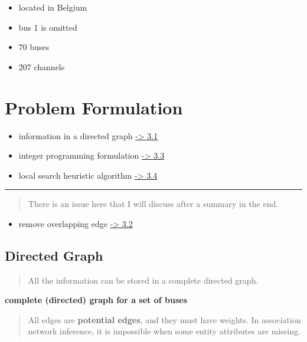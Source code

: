 \documentclass[
]{book}
\providecommand{\tightlist}{%
  \setlength{\itemsep}{0pt}\setlength{\parskip}{0pt}}
\begin{document}
\begin{itemize}
\tightlist
\item
  located in Belgium
\item
  bus 1 is omitted
\item
  70 buses
\item
  207 channels
\end{itemize}

\hypertarget{problem-formulation}{%
\chapter{Problem Formulation}\label{problem-formulation}}

\begin{itemize}
\tightlist
\item
  information in a directed graph \href{directed}{-\textgreater{} 3.1}
\item
  integer programming formulation \protect\hyperlink{IP}{-\textgreater{} 3.3}
\item
  local search heuristic algorithm \protect\hyperlink{combinatorial}{-\textgreater{} 3.4}
\end{itemize}

\begin{center}\rule{0.5\linewidth}{0.5pt}\end{center}

\begin{quote}
There is an issue here that I will discuss after a summary in the end.
\end{quote}

\begin{itemize}
\tightlist
\item
  remove overlapping edge \protect\hyperlink{overlapping}{-\textgreater{} 3.2}
\end{itemize}

\hypertarget{directed}{%
\section{Directed Graph}\label{directed}}

\begin{quote}
All the information can be stored in a complete directed graph.
\end{quote}

\textbf{complete (directed) graph for a set of buses}

\begin{quote}
All edges are \textbf{potential edges}, and they must have weights. In association
network inference, it is impossible when some entity attributes are missing.
\end{quote}
\end{document}
